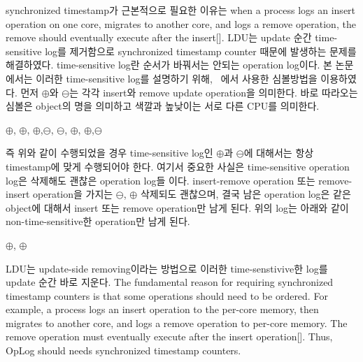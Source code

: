 \ifkor
synchronized timestamp가 근본적으로 필요한 이유는 when a process logs an insert operation
on one core, migrates to another core, and logs a remove operation, the remove
should eventually execute after the insert[].
LDU는 update 순간 time-sensitive log를 제거함으로 synchronized timestamp counter 때문에 발생하는
문제를 해결하였다.
time-sensitive log란 순서가 바꿔서는 안되는 operation log이다. 
본 논문에서는 이러한 time-sensitive log를 설명하기 위해, ~\cite{Clements15SCR}에서 사용한 심볼방법을
이용하였다.
먼저 $\oplus$와 $\ominus$는 각각 insert와 remove update operation을 의미한다.
바로 따라오는 심볼은 object의 명을 의미하고 색깔과 높낮이는 서로 다른 CPU를 의미한다.
\begin{center}
$\oplus$, $\oplus$, $\oplus$,$\ominus$,
$\ominus$, $\oplus$, $\oplus$,$\ominus$
\end{center}
즉 위와 같이 수행되었을 경우 time-sensitive log인 $\oplus$과 $\ominus$에
대해서는 항상 timestamp에 맞게 수행되어야 한다.
여기서 중요한 사실은 time-sensitive operation log은 삭제해도 괜찮은 operation log들 이다.
insert-remove operation 또는 remove-insert operation을 가지는 
$\ominus$, $\oplus$ 삭제되도 괜찮으며, 결국 남은 operation log은 같은
object에 대해서 insert 또는 remove operation만 남게 된다.
위의 log는 아래와 같이 non-time-sensitive한 operation만 남게 된다.
\begin{center}
 $\oplus$, $\oplus$
\end{center}
LDU는 update-side removing이라는 방법으로 이러한 time-senstivive한 log를 update 순간 바로
지운다.
\else
The fundamental reason for requiring synchronized timestamp counters is that 
some operations should need to be ordered.
For example, a process logs an insert operation to the per-core memory, then
migrates to another core, and logs a remove operation to per-core memory.
The remove operation must eventually execute after the insert operation[].
Thus, OpLog should needs synchronized timestamp counters.
